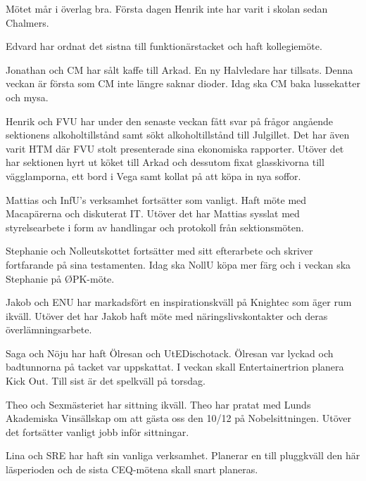 \documentclass[10pt]{article}
\begin{document}
\begin{paragrafer}
\begin{fyllnadsval}


\end{fyllnadsval}

\begin{paragrafer}
Mötet mår i överlag bra. Första dagen Henrik inte har varit i skolan sedan Chalmers. 

Edvard har ordnat det sistna till funktionärstacket och haft kollegiemöte. 

Jonathan och CM har sålt kaffe till Arkad. En ny Halvledare har tillsats. Denna veckan är första som CM inte längre saknar dioder. 
Idag ska CM baka lussekatter och mysa. 

Henrik och FVU har under den senaste veckan fått svar på frågor angående sektionens alkoholtillstånd samt sökt alkoholtillstånd till Julgillet. 
Det har även varit HTM där FVU stolt presenterade sina ekonomiska rapporter. Utöver det har sektionen hyrt ut köket till Arkad och dessutom fixat glasskivorna till vägglamporna, ett bord i Vega samt kollat på att köpa in nya soffor.

Mattias och InfU's verksamhet fortsätter som vanligt. Haft möte med Macapärerna och diskuterat IT. Utöver det har Mattias sysslat med styrelsearbete i form av handlingar och protokoll från sektionsmöten.  

Stephanie och Nolleutskottet fortsätter med sitt efterarbete och skriver fortfarande på sina testamenten. Idag ska NollU köpa mer färg och i veckan ska Stephanie på ØPK-möte.

Jakob och ENU har markadsfört en inspirationskväll på Knightec som äger rum ikväll. Utöver det har Jakob haft möte med näringslivskontakter och deras överlämningsarbete. 

Saga och Nöju har haft Ölresan och UtEDischotack. Ölresan var lyckad och badtunnorna på tacket var uppskattat. I veckan skall Entertainertrion planera Kick Out. Till sist är det spelkväll på torsdag.

Theo och Sexmästeriet har sittning ikväll. Theo har pratat med Lunds Akademiska Vinsällskap om att gästa oss den 10/12 på Nobelsittningen. Utöver det fortsätter vanligt jobb inför sittningar. 

Lina och SRE har haft sin vanliga verksamhet. Planerar en till pluggkväll den här läsperioden och de sista CEQ-mötena skall snart planeras. 



\end{paragrafer}
\end{paragrafer}
\end{document}
